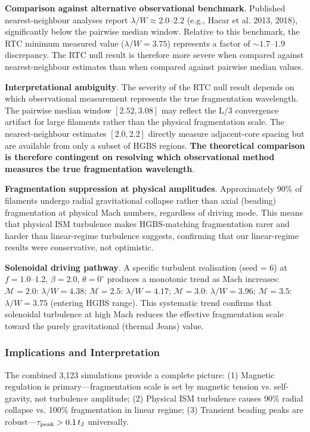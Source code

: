 \documentclass[twocolumn,usenatbib]{mnras}
\begin{document}
\textbf{Comparison against alternative observational benchmark}. Published nearest-neighbour analyses report $\lambda/W \approx 2.0$--$2.2$ (e.g., Hacar et al. 2013, 2018), significantly below the pairwise median window. Relative to this benchmark, the RTC minimum measured value ($\lambda/W = 3.75$) represents a factor of $\sim 1.7$--$1.9$ discrepancy. The RTC null result is therefore more severe when compared against nearest-neighbour estimates than when compared against pairwise median values.

\textbf{Interpretational ambiguity}. The severity of the RTC null result depends on which observational measurement represents the true fragmentation wavelength. The pairwise median window $[2.52, 3.08]$ may reflect the L/3 convergence artifact for large filaments rather than the physical fragmentation scale. The nearest-neighbour estimates $[2.0, 2.2]$ directly measure adjacent-core spacing but are available from only a subset of HGBS regions. \textbf{The theoretical comparison is therefore contingent on resolving which observational method measures the true fragmentation wavelength}.

\textbf{Fragmentation suppression at physical amplitudes}. Approximately 90\% of filaments undergo radial gravitational collapse rather than axial (beading) fragmentation at physical Mach numbers, regardless of driving mode. This means that physical ISM turbulence makes HGBS-matching fragmentation rarer and harder than linear-regime turbulence suggests, confirming that our linear-regime results were conservative, not optimistic.

\textbf{Solenoidal driving pathway}. A specific turbulent realisation (seed = 6) at $f = 1.0$--$1.2$, $\beta = 2.0$, $\theta = 0^{\circ}$ produces a monotonic trend as Mach increases: $\mathcal{M} = 2.0$: $\lambda/W = 4.38$; $\mathcal{M} = 2.5$: $\lambda/W = 4.17$; $\mathcal{M} = 3.0$: $\lambda/W = 3.96$; $\mathcal{M} = 3.5$: $\lambda/W = 3.75$ (entering HGBS range). This systematic trend confirms that solenoidal turbulence at high Mach reduces the effective fragmentation scale toward the purely gravitational (thermal Jeans) value.

\subsubsection{Implications and Interpretation}

The combined 3,123 simulations provide a complete picture: (1) Magnetic regulation is primary—fragmentation scale is set by magnetic tension vs. self-gravity, not turbulence amplitude; (2) Physical ISM turbulence causes 90\% radial collapse vs. 100\% fragmentation in linear regime; (3) Transient beading peaks are robust—$\tau_{\rm peak} > 0.1\,t_{\rm J}$ universally.
\end{document}
